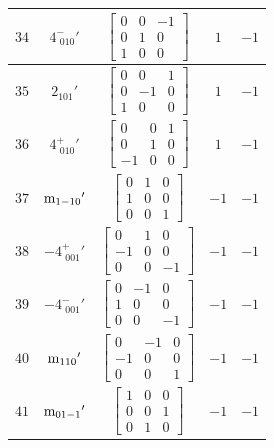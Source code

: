\documentclass[fleqn,8pt]{jsarticle}
\begin{document}
\begin{longtable}{ccccc}
$ 34 $ & $ 4^{-}_{\,\,010}{}' $ & $ \begin{bmatrix} 0 & 0 & -1 \\ 0 & 1 & 0 \\ 1 & 0 & 0 \end{bmatrix} $ & $ 1 $ & $ -1 $ \\ \hline
$ 35 $ & $ 2{}_{101}{}' $ & $ \begin{bmatrix} 0 & 0 & 1 \\ 0 & -1 & 0 \\ 1 & 0 & 0 \end{bmatrix} $ & $ 1 $ & $ -1 $ \\ \hline
$ 36 $ & $ 4^{+}_{\,\,010}{}' $ & $ \begin{bmatrix} 0 & 0 & 1 \\ 0 & 1 & 0 \\ -1 & 0 & 0 \end{bmatrix} $ & $ 1 $ & $ -1 $ \\ \hline
$ 37 $ & $ {\rm m}_{1-10}{}' $ & $ \begin{bmatrix} 0 & 1 & 0 \\ 1 & 0 & 0 \\ 0 & 0 & 1 \end{bmatrix} $ & $ -1 $ & $ -1 $ \\ \hline
$ 38 $ & $ -4^{+}_{\,\,001}{}' $ & $ \begin{bmatrix} 0 & 1 & 0 \\ -1 & 0 & 0 \\ 0 & 0 & -1 \end{bmatrix} $ & $ -1 $ & $ -1 $ \\ \hline
$ 39 $ & $ -4^{-}_{\,\,001}{}' $ & $ \begin{bmatrix} 0 & -1 & 0 \\ 1 & 0 & 0 \\ 0 & 0 & -1 \end{bmatrix} $ & $ -1 $ & $ -1 $ \\ \hline
$ 40 $ & $ {\rm m}_{110}{}' $ & $ \begin{bmatrix} 0 & -1 & 0 \\ -1 & 0 & 0 \\ 0 & 0 & 1 \end{bmatrix} $ & $ -1 $ & $ -1 $ \\ \hline
$ 41 $ & $ {\rm m}_{01-1}{}' $ & $ \begin{bmatrix} 1 & 0 & 0 \\ 0 & 0 & 1 \\ 0 & 1 & 0 \end{bmatrix} $ & $ -1 $ & $ -1 $ \\ \hline

\end{longtable}
\end{document}
